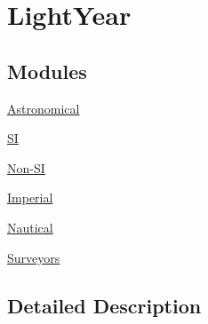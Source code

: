 \hypertarget{group___e_g_x_math-_conversions-_length_conversions-_astronomical-_light_year}{}\section{Light\+Year}
\label{group___e_g_x_math-_conversions-_length_conversions-_astronomical-_light_year}
\subsection*{Modules}
\begin{DoxyCompactItemize}
\item 
\mbox{\hyperlink{group___e_g_x_math-_conversions-_length_conversions-_astronomical-_light_year-_astronomical}{Astronomical}}
\item 
\mbox{\hyperlink{group___e_g_x_math-_conversions-_length_conversions-_astronomical-_light_year-_s_i}{SI}}
\item 
\mbox{\hyperlink{group___e_g_x_math-_conversions-_length_conversions-_astronomical-_light_year-_non-_s_i}{Non-\/\+SI}}
\item 
\mbox{\hyperlink{group___e_g_x_math-_conversions-_length_conversions-_astronomical-_light_year-_imperial}{Imperial}}
\item 
\mbox{\hyperlink{group___e_g_x_math-_conversions-_length_conversions-_astronomical-_light_year-_nautical}{Nautical}}
\item 
\mbox{\hyperlink{group___e_g_x_math-_conversions-_length_conversions-_astronomical-_light_year-_surveyors}{Surveyors}}
\end{DoxyCompactItemize}


\subsection{Detailed Description}
